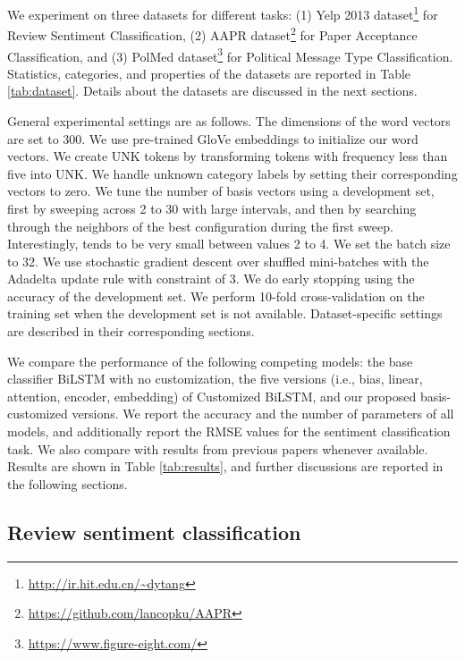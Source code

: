 \documentclass[11pt,a4paper]{article}
\begin{document}
We experiment on three datasets for different tasks: (1) Yelp 2013 dataset\footnote{\url{http://ir.hit.edu.cn/~dytang}} \cite{tang2015learning} for Review Sentiment Classification, (2) AAPR dataset\footnote{\url{https://github.com/lancopku/AAPR}} \cite{yang2018automatic} for Paper Acceptance Classification, and (3) PolMed dataset\footnote{\url{https://www.figure-eight.com/}} for Political Message Type Classification. Statistics, categories, and properties of the datasets are reported in Table \ref{tab:dataset}. Details about the datasets are discussed in the next sections.

General experimental settings are as follows. The dimensions of the word vectors are set to 300. We use pre-trained GloVe embeddings \cite{pennington2014glove} to initialize our word vectors. We create UNK tokens by transforming tokens with frequency less than five into UNK. We handle unknown category labels by setting their corresponding vectors to zero. We tune the number of basis vectors  using a development set, first by sweeping across 2 to 30 with large intervals, and then by searching through the neighbors of the best configuration during the first sweep. Interestingly,  tends to be very small between values 2 to 4. We set the batch size to 32. We use stochastic gradient descent over shuffled mini-batches with the Adadelta update rule \cite{zeiler2012adadelta} with  constraint of 3. We do early stopping using the accuracy of the development set. We perform 10-fold cross-validation on the training set when the development set is not available. Dataset-specific settings are described in their corresponding sections.

We compare the performance of the following competing models: the base classifier \mbox{BiLSTM} with no customization, the five versions (i.e., bias, linear, attention, encoder, embedding) of Customized \mbox{BiLSTM}, and our proposed basis-customized versions. We report the accuracy and the number of parameters of all models, and additionally report the RMSE values for the sentiment classification task. We also compare with results from previous papers whenever available. Results are shown in Table \ref{tab:results}, and further discussions are reported in the following sections.

\subsection{Review sentiment classification}
\end{document}
